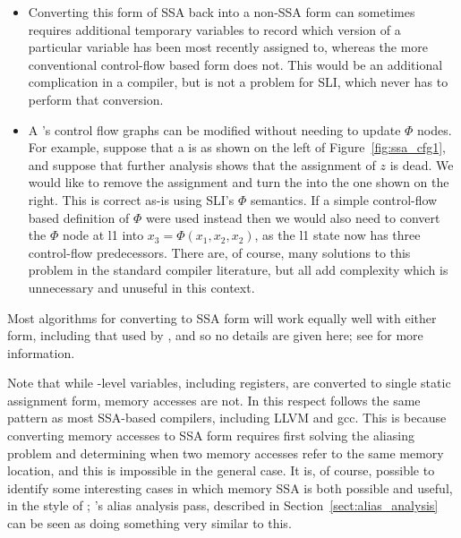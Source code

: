 \begin{itemize}
\item
  Converting this form of SSA back into a non-SSA form can sometimes
  requires additional temporary variables to record which version of a
  particular variable has been most recently assigned to, whereas the
  more conventional control-flow based form does not.  This would be
  an additional complication in a compiler, but is not a problem for
  SLI, which never has to perform that conversion.
\item
  A {\StateMachine}'s control flow graphs can be modified without
  needing to update $\Phi$ nodes.  For example, suppose that a
  {\StateMachine} is as shown on the left of
  Figure~\ref{fig:ssa_cfg1}, and suppose that further analysis shows
  that the assignment of $z$ is dead.  We would like to remove the
  assignment and turn the {\StateMachine} into the one shown on the
  right.  This is correct as-is using SLI's $\Phi$ semantics.  If a
  simple control-flow based definition of $\Phi$ were used instead
  then we would also need to convert the $\Phi$ node at l1 into $x_3 =
  \Phi(x_1, x_2, x_2)$, as the l1 state now has three control-flow
  predecessors.  There are, of course, many solutions to this problem
  in the standard compiler literature\needCite{}, but all add
  complexity which is unnecessary and unuseful in this context.
\end{itemize}

Most algorithms for converting to SSA form will work equally well with
either form, including that used by \implementation, and so no details
are given here; see \needCite{} for more information.


Note that while {\StateMachine}-level variables, including registers,
are converted to single static assignment form, memory accesses are
not.  In this respect {\technique} follows the same pattern as most
SSA-based compilers, including LLVM\needCite{} and gcc.  This is
because converting memory accesses to SSA form requires first solving
the aliasing problem and determining when two memory accesses refer to
the same memory location, and this is impossible in
the general case.  It is, of course, possible to identify some
interesting cases in which memory SSA is both possible and useful, in
the style of ; {\technique}'s alias
analysis pass, described in Section~\ref{sect:alias_analysis} can be
seen as doing something very similar to this.

